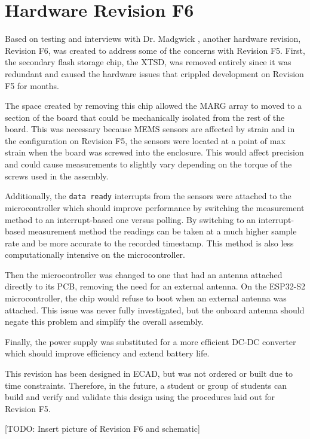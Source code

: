\section{Hardware Revision F6} 
Based on testing and interviews with Dr. Madgwick \cite{Duffy:2023}, another hardware revision, Revision F6, was created to address some of the concerns with Revision F5.
First, the secondary flash storage chip, the XTSD, was removed entirely since it was redundant and caused the hardware issues that crippled development on Revision F5 for months.

The space created by removing this chip allowed the MARG array to moved to a section of the board that could be mechanically isolated from the rest of the board.
This was necessary because MEMS sensors are affected by strain and in the configuration on Revision F5, the sensors were located at a point of max strain when the board was screwed into the enclosure.
This would affect precision and could cause measurements to slightly vary depending on the torque of the screws used in the assembly.

Additionally, the \lstinline[style=customInline]|data ready| interrupts from the sensors were attached to the microcontroller which should improve performance by switching the measurement method to an interrupt-based one versus polling.
By switching to an interrupt-based measurement method the readings can be taken at a much higher sample rate and be more accurate to the recorded timestamp.
This method is also less computationally intensive on the microcontroller.

Then the microcontroller was changed to one that had an antenna attached directly to its PCB, removing the need for an external antenna.
On the ESP32-S2 microcontroller, the chip would refuse to boot when an external antenna was attached.
This issue was never fully investigated, but the onboard antenna should negate this problem and simplify the overall assembly.

Finally, the power supply was substituted for a more efficient DC-DC converter which should improve efficiency and extend battery life.

This revision has been designed in ECAD, but was not ordered or built due to time constraints.
Therefore, in the future, a student or group of students can build and verify and validate this design using the procedures laid out for Revision F5.

[TODO: Insert picture of Revision F6 and schematic]


